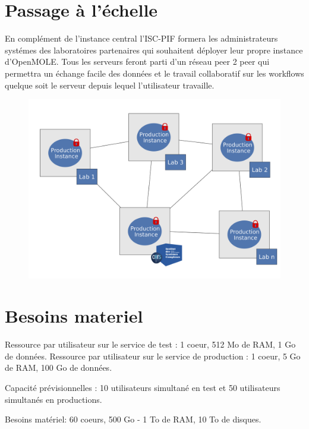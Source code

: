\documentclass[10pt,a4paper]{article}
\begin{document}
\section{Passage à l'échelle}

En complément de l'instance central l'ISC-PIF formera les administrateurs systémes des laboratoires partenaires qui souhaitent déployer leur propre instance d'OpenMOLE. Tous les serveurs feront parti d'un réseau peer 2 peer qui permettra un échange facile des données et le travail collaboratif sur les workflows quelque soit le serveur depuis lequel l'utilisateur travaille.

\begin{figure}[h]
 \centering
  \includegraphics[width=0.8\linewidth]{img/instances-p2p.png}
\end{figure}


\section{Besoins materiel}

Ressource par utilisateur sur le service de test : 1 coeur, 512 Mo de RAM, 1 Go de données.
Ressource par utilisateur sur le service de production : 1 coeur, 5 Go de RAM, 100 Go de données.

Capacité prévisionnelles : 10 utilisateurs simultané en test et 50 utilisateurs simultanés en productions.

Besoins matériel: 60 coeurs, 500 Go - 1 To de RAM, 10 To de disques.
\end{document}

